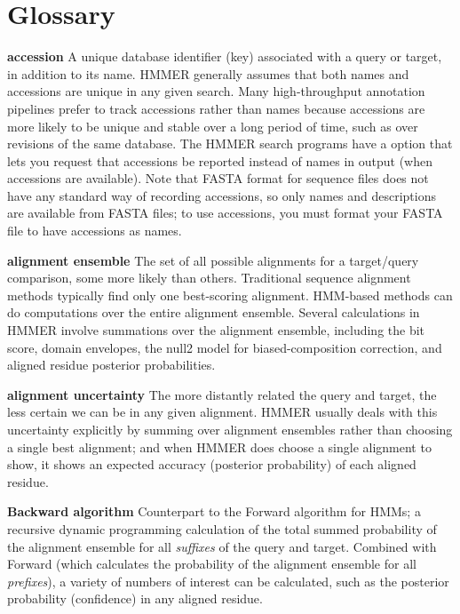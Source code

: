 
\section{Glossary}
\setcounter{footnote}{0}

\begin{wideitem}

\item[\textbf{accession}] A unique database identifier (key)
  associated with a query or target, in addition to its name. HMMER
  generally assumes that both names and accessions are unique in any
  given search. Many high-throughput annotation pipelines prefer to
  track accessions rather than names because accessions are more
  likely to be unique and stable over a long period of time, such as
  over revisions of the same database. The HMMER search programs have
  a  option that lets you request that accessions be
  reported instead of names in output (when accessions are
  available). Note that FASTA format for sequence files does not have
  any standard way of recording accessions, so only names and
  descriptions are available from FASTA files; to use accessions, you
  must format your FASTA file to have accessions as names.

\item[\textbf{alignment ensemble}] The set of all possible alignments
  for a target/query comparison, some more likely than others.
  Traditional sequence alignment methods typically find only one
  best-scoring alignment. HMM-based methods can do computations over
  the entire alignment ensemble. Several calculations in HMMER involve
  summations over the alignment ensemble, including the bit score,
  domain envelopes, the null2 model for biased-composition correction,
  and aligned residue posterior probabilities.

\item[\textbf{alignment uncertainty}] The more distantly related the
  query and target, the less certain we can be in any given
  alignment. HMMER usually deals with this uncertainty explicitly by
  summing over alignment ensembles rather than choosing a single best
  alignment; and when HMMER does choose a single alignment to show, it
  shows an expected accuracy (posterior probability) of each aligned
  residue.

\item[\textbf{Backward algorithm}] Counterpart to the Forward
  algorithm for HMMs; a recursive dynamic programming calculation of
  the total summed probability of the alignment ensemble for all
  \emph{suffixes} of the query and target. Combined with Forward
  (which calculates the probability of the alignment ensemble for all
  \emph{prefixes}), a variety of numbers of interest can be
  calculated, such as the posterior probability (confidence) in any
  aligned residue.


\end{wideitem}

